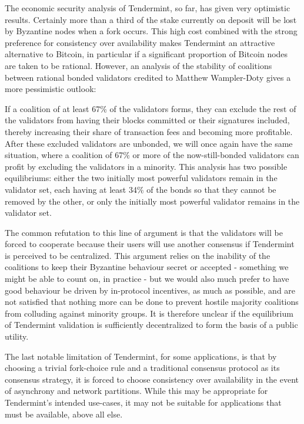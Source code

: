 \documentclass[11pt,a4paper]{article}
\theoremstyle{plain}
\theoremstyle{definition}
\begin{document}
The economic security analysis of Tendermint, so far, has given very optimistic results. Certainly more than a third of the stake currently on deposit will be lost by Byzantine nodes when a fork occurs. This high cost combined with the strong preference for consistency over availability makes Tendermint an attractive alternative to Bitcoin, in particular if a significant proportion of Bitcoin nodes are taken to be rational. However, an analysis of the stability of coalitions between rational bonded validators credited to Matthew Wampler-Doty gives a more pessimistic outlook:

If a coalition of at least 67\% of the validators forms, they can exclude the rest of the validators from having their blocks committed or their signatures included, thereby increasing their share of transaction fees and becoming more profitable. After these excluded validators are unbonded, we will once again have the same situation, where a coalition of 67\% or more of the now-still-bonded validators can profit by excluding the validators in a minority. This analysis has two possible equilibriums: either the two initially most powerful validators remain in the validator set, each having at least 34\% of the bonds so that they cannot be removed by the other, or only the initially most powerful validator remains in the validator set. 

The common refutation to this line of argument is that the validators will be forced to cooperate because their users will use another consensus if Tendermint is perceived to be centralized. This argument relies on the inability of the coalitions to keep their Byzantine behaviour secret or accepted - something we might be able to count on, in practice - but we would also much prefer to have good behaviour be driven by in-protocol incentives, as much as possible, and are not satisfied that nothing more can be done to prevent hostile majority coalitions from colluding against minority groups. It is therefore unclear if the equilibrium of Tendermint validation is sufficiently decentralized to form the basis of a public utility.

The last notable limitation of Tendermint, for some applications, is that by choosing a trivial fork-choice rule and a traditional consensus protocol as its consensus strategy, it is forced to choose consistency over availability in the event of asynchrony and network partitions. While this may be appropriate for Tendermint's intended use-cases, it may not be suitable for applications that must be available, above all else. 
\end{document}
